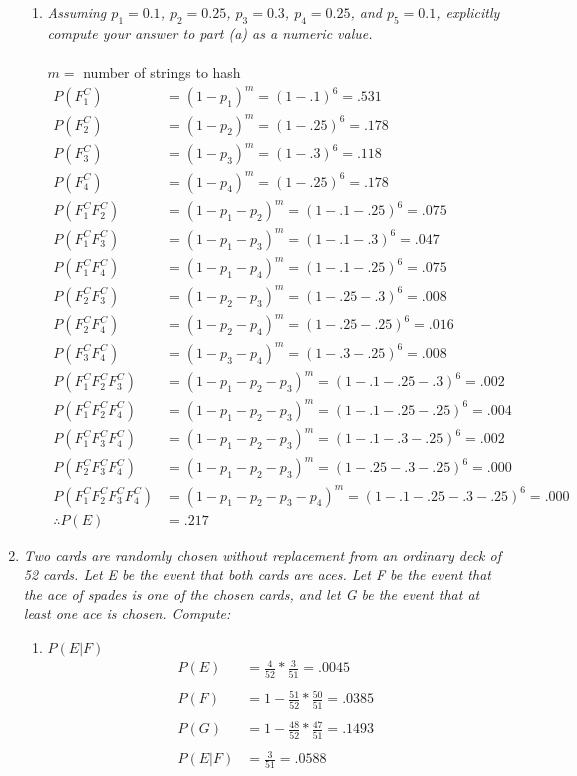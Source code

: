 \documentclass{article} %
\begin{document}
\begin{enumerate}
\begin{enumerate}
		\item \textit{Assuming $p_1 = 0.1$, $p_2 = 0.25$, $p_3 = 0.3$, $p_4 = 0.25$, and $p_5 = 0.1$, explicitly compute your answer to part (a) as a numeric value.}\\
		\\
		$m =$ number of strings to hash
		\begin{align*}
		P(F_1^C) &= (1 - p_1)^m = (1 - .1)^6 = .531\\
		P(F_2^C) &= (1 - p_2)^m = (1 - .25)^6 = .178\\
		P(F_3^C) &= (1 - p_3)^m = (1 - .3)^6 = .118\\
		P(F_4^C) &= (1 - p_4)^m = (1 - .25)^6 = .178\\
		P(F_1^CF_2^C) &= (1 - p_1 - p_2)^m = (1 - .1 - .25)^6 = .075\\
		P(F_1^CF_3^C) &= (1 - p_1 - p_3)^m = (1 - .1 - .3)^6 = .047\\
		P(F_1^CF_4^C) &= (1 - p_1 - p_4)^m = (1 - .1 - .25)^6 = .075\\
		P(F_2^CF_3^C) &= (1 - p_2 - p_3)^m = (1 - .25 - .3)^6 = .008\\
		P(F_2^CF_4^C) &= (1 - p_2 - p_4)^m = (1 - .25 - .25)^6 = .016\\
		P(F_3^CF_4^C) &= (1 - p_3 - p_4)^m = (1 - .3 - .25)^6 = .008\\
		P(F_1^CF_2^CF_3^C) &= (1 - p_1 - p_2 - p_3)^m = (1 - .1 - .25 - .3)^6 = .002\\
		P(F_1^CF_2^CF_4^C) &= (1 - p_1 - p_2 - p_3)^m = (1 - .1 - .25 - .25)^6 = .004\\
		P(F_1^CF_3^CF_4^C) &= (1 - p_1 - p_2 - p_3)^m = (1 - .1 - .3 - .25)^6 = .002\\
		P(F_2^CF_3^CF_4^C) &= (1 - p_1 - p_2 - p_3)^m = (1 - .25 - .3 - .25)^6 = .000\\
		P(F_1^CF_2^CF_3^CF_4^C) &= (1 - p_1 - p_2 - p_3 - p_4)^m = (1 - .1 - .25 - .3 - .25)^6 = .000\\
		\therefore P(E) &= .217
		\end{align*}
	
	\end{enumerate}
	
	\item \textit{Two cards are randomly chosen without replacement from an ordinary deck of 52 cards. Let E be the event that both cards are aces. Let F be the event that the ace of spades is one of the chosen cards, and let G be the event that at least one ace is chosen. Compute:}
	\begin{enumerate}
		\item $P(E | F)$
		\begin{align*}
		P(E) &= \frac{4}{52} * \frac{3}{51} = .0045\\\\
		P(F) &= 1 - \frac{51}{52} * \frac{50}{51} = .0385\\\\
		P(G) &= 1 - \frac{48}{52} * \frac{47}{51} = .1493\\\\
		P(E | F) &= \frac{3}{51} = .0588
		\end{align*}
		

\end{enumerate}
\end{enumerate}
\end{document}
